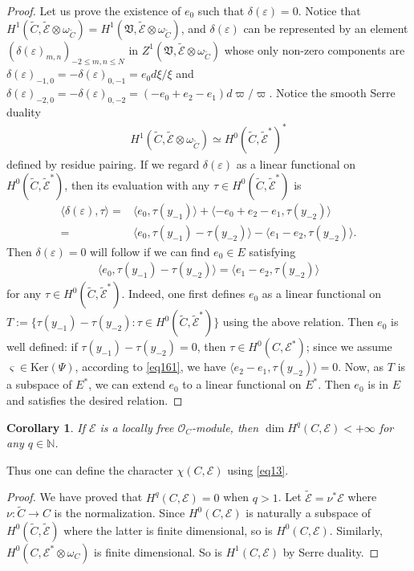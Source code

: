 \documentclass[12pt,b5paper,notitlepage]{report}
\theoremstyle{definition}
\theoremstyle{plain}
\newtheorem{co}[df]{Corollary}
\newcommand{\fk}{\mathfrak}
\newcommand{\wtd}{\widetilde}
\newcommand{\bk}[1]{\langle {#1}\rangle}
\newcommand{\scr}{\mathscr}
\newcommand{\sgm}{\varsigma}
\newcommand{\mbb}{\mathbb}
\newcommand{\Ker}{\mathrm{Ker}}
\numberwithin{equation}{section}
\begin{document}
\begin{proof}
Let us prove the existence of $e_0$ such that $\delta(\varepsilon)=0$. Notice that $H^1(\wtd C,\wtd{\scr E}\otimes\omega_{\wtd C})=H^1(\fk V,\wtd{\scr E}\otimes\omega_{\wtd C})$, and $\delta(\varepsilon)$ can be represented by an element  $(\delta(\varepsilon)_{m,n})_{-2\leq m,n\leq N}$ in $Z^1(\fk V,\wtd{\scr E}\otimes\omega_{\wtd C})$ whose only non-zero components are $\delta(\varepsilon)_{-1,0}=-\delta(\varepsilon)_{0,-1}=e_0d\xi/\xi$ and $\delta(\varepsilon)_{-2,0}=-\delta(\varepsilon)_{0,-2}=(-e_0+e_2-e_1)d\varpi/\varpi$. Notice the smooth Serre duality
\begin{align*}
H^1(\wtd C,\wtd{\scr E}\otimes\omega_{\wtd C})\simeq H^0(\wtd C,\wtd{\scr E}^*)^*
\end{align*}
defined by residue pairing. If we regard $\delta(\varepsilon)$ as a linear functional on $H^0(\wtd C,\wtd{\scr E}^*)$, then its evaluation with any $\tau\in H^0(\wtd C,\wtd{\scr E}^*)$ is
\begin{align*}
\bk{\delta(\varepsilon),\tau}=&\bk{e_0,\tau(y_{-1})}+\bk{-e_0+e_2-e_1,\tau(y_{-2})}\\
=&\bk{e_0,\tau(y_{-1})-\tau(y_{-2})}-\bk{e_1-e_2,\tau(y_{-2})}.
\end{align*}
Then $\delta(\varepsilon)=0$ will follow if we can find $e_0\in E$ satisfying
\begin{align*}
\bk{e_0,\tau(y_{-1})-\tau(y_{-2})}=\bk{e_1-e_2,\tau(y_{-2})}
\end{align*}
for any $\tau\in H^0(\wtd C,\wtd{\scr E}^*)$. Indeed, one first  defines $e_0$ as a linear functional on $T:=\{\tau(y_{-1})-\tau (y_{-2}):\tau\in H^0(\wtd C,\wtd {\scr E}^*)\}$ using the above relation. Then $e_0$ is well defined: if $\tau(y_{-1})-\tau(y_{-2})=0$, then $\tau\in H^0(C,\scr E^*)$; since we assume $\sgm\in\Ker(\Psi)$, according to \eqref{eq161}, we have $\bk{e_2-e_1,\tau(y_{-2})}=0$. Now, as $T$ is a subspace of $E^*$, we can extend $e_0$ to a linear functional on $E^*$. Then $e_0$ is in $E$ and satisfies the desired relation.
\end{proof}


\begin{co}
If $\scr E$ is a locally free $\scr O_C$-module, then $\dim H^q(C,\scr E)<+\infty$ for any $q\in\mbb N$.
\end{co}

Thus one can define the character $\chi(C,\scr E)$ using \eqref{eq13}.


\begin{proof}
We have proved that $H^q(C,\scr E)=0$ when $q>1$. Let $\wtd{\scr E}=\nu^*\scr E$ where $\nu:\wtd C\rightarrow C$ is the normalization. Since $H^0(C,\scr E)$ is naturally a subspace of $H^0(\wtd C,\wtd{\scr E})$ where the latter is finite dimensional, so is $H^0(C,\scr E)$. Similarly, $H^0(C,\scr E^*\otimes\omega_C)$ is finite dimensional. So is $H^1(C,\scr E)$ by Serre duality. 
\end{proof}
\end{document}
